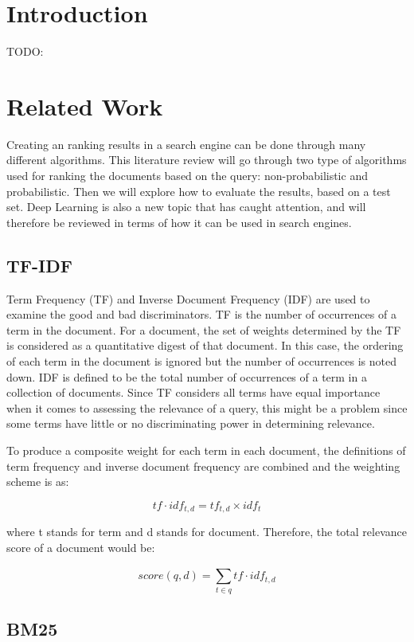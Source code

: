 \section{Introduction}

TODO:

\section{Related Work}
Creating an ranking results in a search engine can be done through many different algorithms. This literature review will go through two type of algorithms used for ranking the documents based on the query: non-probabilistic and probabilistic. Then we will explore how to evaluate the results, based on a test set. Deep Learning is also a new topic that has caught attention, and will therefore be reviewed in terms of how it can be used in search engines.

\subsection{TF-IDF} %
\label{sub:tf_idf}

Term Frequency (TF) and Inverse Document Frequency (IDF)  are used to examine the good and bad discriminators. TF is the number of occurrences of a term in the document. For a document, the set of weights determined by the TF is considered as a quantitative digest of that document. In this case, the ordering of each term in the document is ignored but the number of occurrences is noted down. IDF is defined to be the total number of occurrences of a term in a collection of documents. Since TF considers all terms have equal importance when it comes to assessing the relevance of a query, this might be a problem since some terms have little or no discriminating power in determining relevance.

To produce a composite weight for each term in each document, the definitions of term frequency and inverse document frequency are combined and the weighting scheme is as:

\[tf\cdot idf_{t,d}=tf_{t,d}\times idf_{t}\]

where t stands for term and d stands for document. Therefore, the total relevance score of a document would be:

\[score(q,d)=\sum_{t\in q}^{} tf\cdot idf_{t,d}\]


\subsection{BM25} %
\label{sub:bm25}

